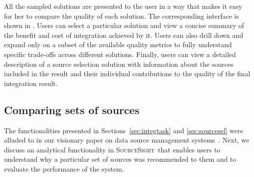 \documentclass{vldb}
\newcommand\system{\textsc{SourceSight}}
\begin{document}
All the sampled solutions are presented to the user in a way that makes it easy for her to compare the quality of each solution. The corresponding interface is shown in . Users can select a particular solution and view a concise summary of the benefit and cost of integration achieved by it. Users can also drill down and expand only on a subset of the available quality metrics to fully understand specific trade-offs across different solutions. Finally, users can view a detailed description of a source selection solution with information about the sources included in the result and their individual contributions to the quality of the final integration result. 

\subsection{Comparing sets of sources}
\label{sec:extensions}
The functionalities presented in Sections~\ref{sec:integtask} and \ref{sec:sourcesel} were alluded to in our visionary paper on data source management systems~\cite{rekatsinas:2015}. Next, we discuss an analytical functionality in \system~that enables users to understand why a particular set of sources was recommended to them and to evaluate the performance of the system.
\end{document}
